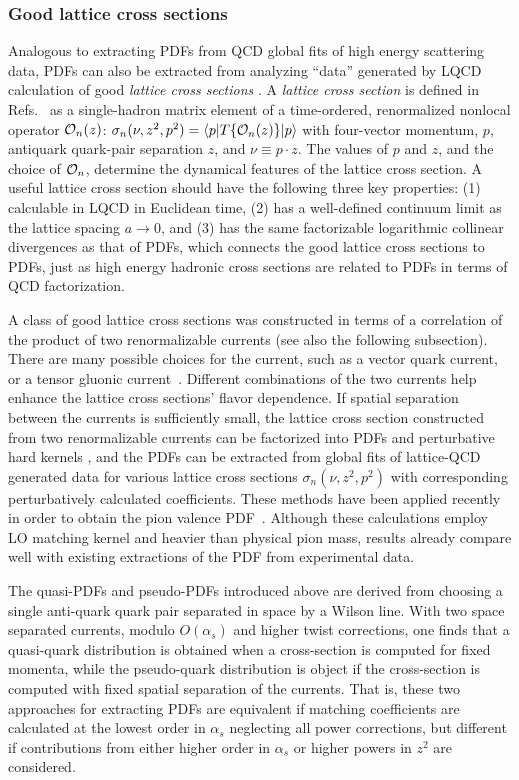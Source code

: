 \subsubsection{Good lattice cross sections}
Analogous to extracting PDFs from QCD global fits of high energy scattering data, PDFs can also be extracted from analyzing ``data'' generated by LQCD calculation of good {\it lattice cross sections} \cite{Ma:2014jla,Ma:2014jga}. A {\it lattice cross section} is defined in Refs.~\cite{ Ma:2014jla,Ma:2014jga} as a single-hadron matrix element of a time-ordered, renormalized nonlocal operator ${\cal O}_n(z)$: ${\sigma}_{n}(\nu,z^2,p^2)=\langle p| {T}\{{\cal O}_n({z})\}|p\rangle$ with four-vector momentum, $p$, antiquark quark-pair separation $z$, and $\nu\equiv p\cdot z$. The values of $p$ and $z$, and the choice of ${\cal O}_n$, determine the dynamical features of the lattice cross section. A useful lattice cross section should have the following three key properties: (1) calculable in LQCD in Euclidean time, (2) has a well-defined continuum limit as the lattice spacing $a\to 0$, and (3) has the same factorizable logarithmic collinear divergences as that of PDFs, which connects the good lattice cross sections to PDFs, just as high energy hadronic cross sections are related to PDFs in terms of QCD factorization.  

A class of { good} lattice cross sections was constructed in terms of a correlation of the product of two {renormalizable} currents (see also the following subsection).  There are many possible choices for the current, such as a vector quark current, or a tensor gluonic current~\cite{Ma:2017pxb}.  Different combinations of the two currents help enhance the lattice cross sections' flavor dependence.  If spatial separation between the currents is sufficiently small, the lattice cross section constructed from two renormalizable currents can be factorized into PDFs and perturbative hard kernels \cite{Ma:2017pxb},
and the PDFs can be extracted from global fits of lattice-QCD generated data for various lattice cross sections $\sigma_{n}(\nu,z^2,p^2)$ with corresponding perturbatively calculated coefficients. These methods have been applied recently in order to obtain the pion valence PDF~\cite{Sufian:2019bol}. Although these calculations employ LO matching kernel and heavier than physical pion mass, results already compare well with existing extractions of the PDF from experimental data. 

The quasi-PDFs and pseudo-PDFs introduced above are derived from choosing a single anti-quark quark pair separated in space by a Wilson line.
With two space separated currents, modulo $O(\alpha_s)$ and higher twist corrections, one finds that a quasi-quark distribution is obtained when a cross-section is computed for fixed momenta, while the pseudo-quark distribution is object if the cross-section is computed with fixed spatial separation of the currents.  
That is, these two approaches for extracting PDFs are equivalent if matching coefficients are calculated at the lowest order in $\alpha_s$ neglecting all power corrections, but different if contributions from either higher order in $\alpha_s$ or higher powers in $z^2$ are considered.

